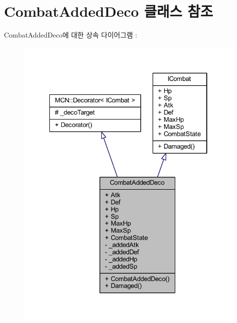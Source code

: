 \hypertarget{class_combat_added_deco}{}\section{Combat\+Added\+Deco 클래스 참조}
\label{class_combat_added_deco}


Combat\+Added\+Deco에 대한 상속 다이어그램 \+: 
\nopagebreak
\begin{figure}[H]
\begin{center}
\leavevmode
\includegraphics[width=322pt]{class_combat_added_deco__inherit__graph}
\end{center}
\end{figure}


